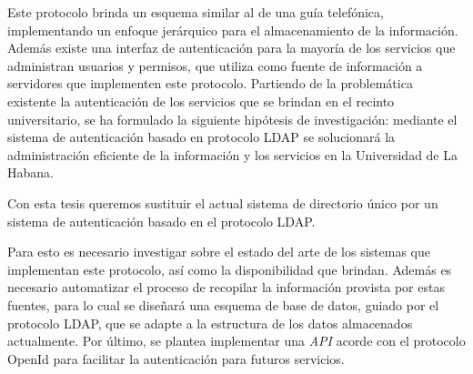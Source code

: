 \begin{introduction}
Este protocolo  brinda un esquema similar al de una guía telefónica, implementando un enfoque jerárquico para el almacenamiento de la información. Además existe una interfaz de autenticación para la mayoría de los servicios que administran usuarios y permisos, que utiliza como fuente de información a servidores que implementen este protocolo. 
Partiendo de la problemática existente la autenticación de los servicios que se brindan en el recinto universitario, se ha formulado la siguiente hipótesis de investigación: mediante el sistema de autenticación basado en protocolo LDAP se solucionará la administración eficiente de la información y los servicios en la Universidad de La Habana.

Con esta tesis queremos sustituir el actual sistema de directorio único por un sistema de autenticación basado en el protocolo LDAP.

Para esto es necesario investigar sobre el estado del arte de los sistemas que implementan este protocolo, así como la disponibilidad que brindan. Además es necesario automatizar el proceso de recopilar la información provista por estas fuentes, para lo cual se diseñará una esquema de base de datos, guiado por el protocolo LDAP, que se adapte a la estructura de los datos almacenados actualmente. Por último, se plantea implementar una \textit{API} acorde con el protocolo OpenId para facilitar la autenticación para futuros servicios.

\listoftodos[Notes]

\end{introduction} 
